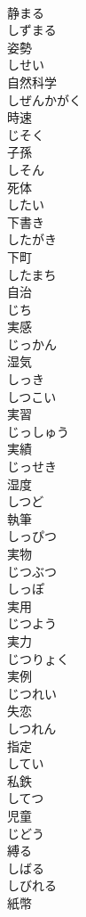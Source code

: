 \documentclass[8pt]{extreport}
\begin{document}
\begin{CJK}{UTF8}{min}
\\	静まる 
\\	しずまる	
\\	姿勢 
\\	しせい	
\\	自然科学 
\\	しぜんかがく	
\\	時速 
\\	じそく	
\\	子孫 
\\	しそん	
\\	死体 
\\	したい	
\\	下書き 
\\	したがき	
\\	下町 
\\	したまち	
\\	自治 
\\	じち	
\\	実感 
\\	じっかん	
\\	湿気 
\\	しっき	
\\	しつこい	
\\	実習 
\\	じっしゅう	
\\	実績 
\\	じっせき	
\\	湿度 
\\	しつど	
\\	執筆 
\\	しっぴつ	
\\	実物 
\\	じつぶつ	
\\	しっぽ	
\\	実用 
\\	じつよう	
\\	実力 
\\	じつりょく	
\\	実例 
\\	じつれい	
\\	失恋 
\\	しつれん	
\\	指定 
\\	してい	
\\	私鉄 
\\	してつ	
\\	児童 
\\	じどう	
\\	縛る 
\\	しばる	
\\	しびれる	
\\	紙幣 

\end{CJK}
\end{document}

